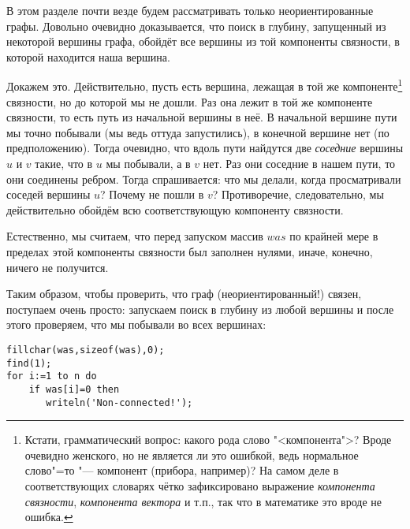 В этом разделе почти везде будем рассматривать только неориентированные графы.
Довольно очевидно доказывается, что поиск в глубину, запущенный из некоторой вершины графа, обойдёт все вершины
из той компоненты связности, в которой находится наша вершина.

Докажем это. Действительно, пусть есть вершина, лежащая в той же 
компоненте\footnote{Кстати, грамматический вопрос: какого рода слово "<компонента">? Вроде очевидно 
женского, но не является ли это ошибкой, ведь нормальное слово"=то "--- компонент (прибора, например)? На самом деле в 
соответствующих словарях чётко зафиксировано выражение \textit{компонента связности}, 
\textit{компонента вектора} и т.п., так что в математике это вроде не ошибка.}
связности, но до которой мы не дошли.
Раз она лежит в той же компоненте связности, то есть путь из начальной вершины в неё. В начальной вершине пути мы точно побывали (мы ведь оттуда запустились), в конечной вершине нет (по предположению). Тогда очевидно, что вдоль пути найдутся
две \textit{соседние} вершины $u$ и $v$ такие, что в $u$ мы побывали, а в $v$ нет. Раз они соседние в нашем пути, то они
соединены ребром. Тогда спрашивается: что мы делали, когда просматривали соседей вершины $u$? Почему не пошли в $v$? 
Противоречие, следовательно, мы действительно обойдём всю соответствующую компоненту связности.


Естественно, мы считаем, что перед запуском массив $was$ по крайней мере в пределах этой компоненты связности был 
заполнен нулями, иначе, конечно, ничего не получится.


Таким образом, чтобы проверить, что граф (неориентированный!) связен, поступаем очень просто: запускаем поиск в 
глубину из любой вершины и после этого проверяем, что мы побывали во всех вершинах:

\begin{codesampleo}\begin{verbatim}
fillchar(was,sizeof(was),0);
find(1);
for i:=1 to n do
    if was[i]=0 then
       writeln('Non-connected!');
\end{verbatim}
\end{codesampleo}

